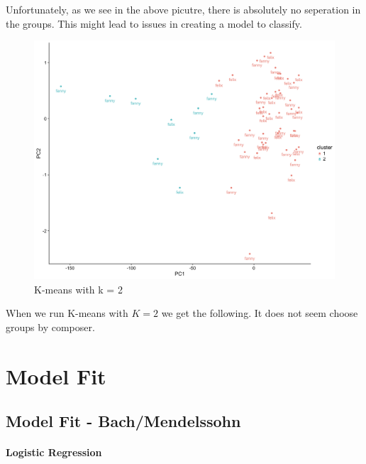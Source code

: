 \documentclass[12pt,twoside]{reedthesis}
\theoremstyle{definition}
\theoremstyle{definition}
\theoremstyle{definition}
\theoremstyle{remark}
\begin{document}
Unfortunately, as we see in the above picutre, there is absolutely no
seperation in the groups. This might lead to issues in creating a model
to classify.
\begin{figure}[h]
\centering
\includegraphics[scale = .3]{images/kmf.png}
\caption{K-means with k = 2}
\label{subd}
\end{figure}
When we run K-means with \(K=2\) we get the following. It does not seem
choose groups by composer.

\chapter{Model Fit}\label{model-fit}

\section{Model Fit -
Bach/Mendelssohn}\label{model-fit---bachmendelssohn}

\subsubsection{Logistic Regression}\label{logistic-regression-1}
\end{document}
